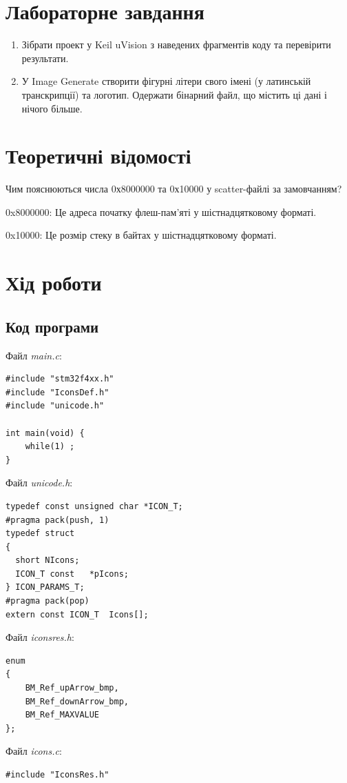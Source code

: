 \documentclass[oneside,14pt]{extarticle}
\begin{document}
\begin{normalsize}
    \section*{Лабораторне завдання}
    \begin{enumerate}
        \item Зібрати проект у Keil uVision з наведених фрагментів коду та перевірити результати.
        \item У Image Generate створити фігурні літери свого імені (у латинській транскрипції) та логотип. Одержати бінарний файл, що містить ці дані і нічого більше. 
    \end{enumerate}

    \section*{Теоретичні відомості}
    Чим пояснюються числа 0х8000000 та 0х10000 у scatter-файлі за замовчанням?
    
    0x8000000: Це адреса початку флеш-пам'яті у шістнадцятковому форматі.
    
    0x10000: Це розмір стеку в байтах у шістнадцятковому форматі.

	\section*{Хід роботи}
	
	\subsection*{Код програми}
	Файл \textit{main.c}:
	{\small
		\begin{lstlisting}
#include "stm32f4xx.h"
#include "IconsDef.h"
#include "unicode.h"

int main(void) {
 	while(1) ;
}

		\end{lstlisting}
	}
	Файл \textit{unicode.h}:
	{\small
		\begin{lstlisting}
typedef const unsigned char *ICON_T;
#pragma pack(push, 1)
typedef struct
{
  short NIcons;         
  ICON_T const   *pIcons;
} ICON_PARAMS_T;
#pragma pack(pop)
extern const ICON_T  Icons[];
		\end{lstlisting}
	}
	Файл \textit{iconsres.h}:
	{\small
		\begin{lstlisting}
enum
{
	BM_Ref_upArrow_bmp,
	BM_Ref_downArrow_bmp,
	BM_Ref_MAXVALUE
};
		\end{lstlisting}
	}
	Файл \textit{icons.c}:
	{\small
		\begin{lstlisting}
#include "IconsRes.h"


\end{lstlisting}}
\end{normalsize}
\end{document}

